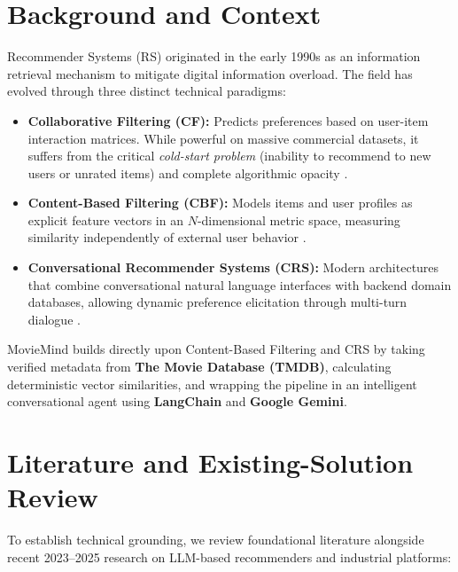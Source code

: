 \documentclass[11pt,a4paper]{article}
\begin{document}
\section{Background and Context}

Recommender Systems (RS) originated in the early 1990s as an information retrieval mechanism to mitigate digital information overload. The field has evolved through three distinct technical paradigms:
\begin{itemize}[leftmargin=*]
    \item \textbf{Collaborative Filtering (CF):} Predicts preferences based on user-item interaction matrices. While powerful on massive commercial datasets, it suffers from the critical \textit{cold-start problem} (inability to recommend to new users or unrated items) and complete algorithmic opacity \cite{koren2009matrix}.
    \item \textbf{Content-Based Filtering (CBF):} Models items and user profiles as explicit feature vectors in an $N$-dimensional metric space, measuring similarity independently of external user behavior \cite{adomavicius2005toward}.
    \item \textbf{Conversational Recommender Systems (CRS):} Modern architectures that combine conversational natural language interfaces with backend domain databases, allowing dynamic preference elicitation through multi-turn dialogue \cite{fan2023recommender}.
\end{itemize}

MovieMind builds directly upon Content-Based Filtering and CRS by taking verified metadata from \textbf{The Movie Database (TMDB)}, calculating deterministic vector similarities, and wrapping the pipeline in an intelligent conversational agent using \textbf{LangChain} and \textbf{Google Gemini}.

\clearpage
\section{Literature and Existing-Solution Review}

To establish technical grounding, we review foundational literature alongside recent 2023--2025 research on LLM-based recommenders and industrial platforms:
\end{document}
